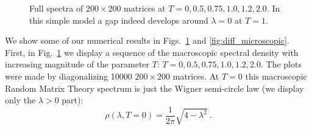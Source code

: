 \documentclass[11pt]{article}
\newcommand{\beq}{\begin{equation}}
\newcommand{\eeq}{\end{equation}}
\newcommand{\noi}{\vspace{12pt}\noindent}
\begin{document}
\begin{figure}
\begin{center}
\textwidth
{}
\end{center}
\vspace*{-2mm}
\caption{Full spectra of $200\times200$ matrices at $T=0, 0.5, 0.75, 1.0,
1.2, 2.0$. In this simple model a gap indeed develops around 
$\lambda = 0$ at $T=1$.}
\label{fig:diff_macroscopic}
\end{figure}
 

\noi
We show some of our numerical results in Figs.~\ref{fig:diff_macroscopic} 
and \ref{fig:diff_microscopic}. First, in 
Fig.~\ref{fig:diff_macroscopic} we display a sequence of the macroscopic 
spectral density with increasing magnitude of the
parameter $T$: $T= 0, 0.5, 0.75, 1.0, 1.2, 2.0$. The plots were made by
diagonalizing 10000 $200\times200$ matrices. At $T=0$ this macroscopic
Random Matrix Theory spectrum is just the Wigner semi-circle law (we display
only the $\lambda > 0$ part):
\beq
\rho(\lambda,T=0) = \frac{1}{2\pi}\sqrt{4 - \lambda^2} ~.
\eeq
\end{document}
